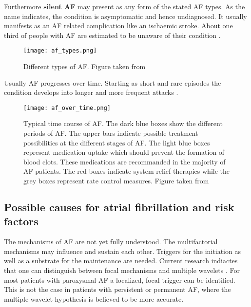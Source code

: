 \documentclass[type=dr, dr=rernat, accentcolor=tud7b,colorbacktitle, bigchapter, openright, twoside, 12pt ]{tudthesis}
\begin{document}
Furthermore \textbf{silent AF} may present as any form of the stated AF types. As the name indicates, the condition is asymptomatic and 
hence undiagnosed. It usually manifests as an AF related complication like an ischaemic stroke. About one third of people with AF are 
estimated to be unaware of their condition \cite{ESC10}.

\begin{figure}[H]
\begin{center}
\texttt{[image: af\_types.png]}
\caption{Different types of AF. Figure taken from \cite{ESC10}}
\label{ecg}
\end{center}
\end{figure}

Usually AF progresses over time. Starting as short and rare episodes the condition develops into longer and more frequent attacks 
\cite{ESC10}. 

\begin{figure}[H]
\begin{center}
\texttt{[image: af\_over\_time.png]}
\caption{Typical time course of AF. The dark blue boxes show the different periods of AF. The upper bars indicate possible treatment 
possibilities at the different stages of AF. The light blue boxes represent medication uptake which should prevent the formation of blood 
clots. These medications are recommanded in the majority of AF patients. The red boxes indicate system relief therapies while the grey 
boxes represent rate control measures. Figure taken from \cite{ESC10}}
\label{afovertime}
\end{center}
\end{figure}



\subsection{Possible causes for atrial fibrillation and risk factors}
\label{AFriskfactor}

The mechanisms of AF are not yet fully understood. The multifactorial mechanisms may influence and sustain each other. Triggers for the 
initiation as well as a substrate for the maintenance are needed. Current research indiactes that one can distinguish between focal 
mechanisms and multiple wavelets \cite{CE09}. For most patients with paroxysmal AF a localized, focal trigger can be identified. This is 
not the case in patients with persistent or permanent AF, where the multiple wavelet hypothesis is believed to be more accurate.\newline
\end{document}
